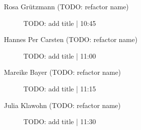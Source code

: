 \begin{symposium}
\begin{description}
    \item [Rosa Grützmann (TODO: refactor name)] TODO: add title \textcolor{mygray}{ | 10:45}    
    
    \item [Hannes Per Carsten (TODO: refactor name)] TODO: add title \textcolor{mygray}{ | 11:00}    
    
    \item [Mareike Bayer (TODO: refactor name)] TODO: add title \textcolor{mygray}{ | 11:15}    
    
    \item [Julia Klawohn  (TODO: refactor name)] TODO: add title \textcolor{mygray}{ | 11:30}    
    
\end{description} 
\end{symposium}
